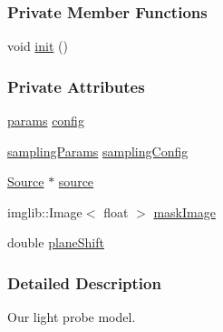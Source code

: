 \subsubsection*{\-Private \-Member \-Functions}
\begin{DoxyCompactItemize}
\item 
void \hyperlink{classLightprobe_a7e2724a719ccd14779aaeb7225b0acc3}{init} ()
\end{DoxyCompactItemize}
\subsubsection*{\-Private \-Attributes}
\begin{DoxyCompactItemize}
\item 
\hyperlink{structLightprobe_1_1params}{params} \hyperlink{classLightprobe_a2a75a5ac0b6fd74f9b6007e6f4bee079}{config}
\item 
\hyperlink{structLightprobe_1_1samplingParams}{sampling\-Params} \hyperlink{classLightprobe_a8b0f2510b3c39b154ef72d571f46c16b}{sampling\-Config}
\item 
\hyperlink{classSource}{\-Source} $\ast$ \hyperlink{classLightprobe_af923276096b3466a64bdda7bd76ed036}{source}
\item 
imglib\-::\-Image$<$ float $>$ \hyperlink{classLightprobe_aab72db6ab7c231959a7c5943ca8fc97f}{mask\-Image}
\item 
double \hyperlink{classLightprobe_a44b795e2f349dd13489799890bd86c9a}{plane\-Shift}
\end{DoxyCompactItemize}


\subsubsection{\-Detailed \-Description}
\-Our light probe model. 

